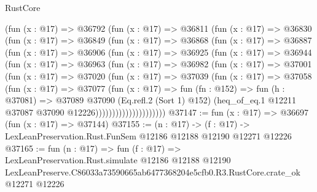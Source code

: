 \begin{lexlean}{RustCore}
\begin{coremodule}
          (fun (x : @17) =>
          @36792
            (fun (x : @17) =>
            @36811
              (fun (x : @17) =>
              @36830
                (fun (x : @17) =>
                @36849
                  (fun (x : @17) =>
                  @36868
                    (fun (x : @17) =>
                    @36887
                      (fun (x : @17) =>
                      @36906
                        (fun (x : @17) =>
                        @36925
                          (fun (x : @17) =>
                          @36944
                            (fun (x : @17) =>
                            @36963
                              (fun (x : @17) =>
                              @36982
                                (fun (x : @17) =>
                                @37001
                                  (fun (x : @17) =>
                                  @37020
                                    (fun (x : @17) =>
                                    @37039
                                      (fun (x : @17) =>
                                      @37058
                                        (fun (x : @17) =>
                                        @37077
                                          (fun (x : @17) =>
                                          fun (fn : @152) =>
                                          fun (h : @37081) =>
                                          @37089
                                            @37090
                                            (Eq.refl.{2} (Sort 1) @152)
                                            (heq_of_eq.{1}
                                              @12211
                                              @37087
                                              @37090
                                              @12226)))))))))))))))))))))
@37147 := fun (x : @17) => @36697 (fun (x : @17) => @37144)
@37155 := (n : @17) ->
  (f : @17) -> LexLeanPreservation.Rust.FunSem @12186 @12188 @12190 @12271 @12226
@37165 := fun (n : @17) =>
  fun (f : @17) =>
  LexLeanPreservation.Rust.simulate
    @12186
    @12188
    @12190
    LexLeanPreserve.C86033a73590665ab6477368204e5cfb0.R3.RustCore.crate_ok
    @12271
    @12226
\end{coremodule}
\end{lexlean}
